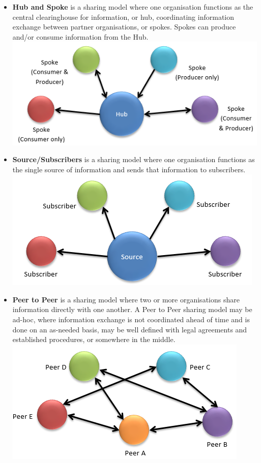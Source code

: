 \documentclass{eplmastersthesis}
\begin{document}
\begin{itemize}
\item \textbf{Hub and Spoke} is a sharing model where one organisation functions as the central clearinghouse for information, or hub, coordinating information exchange between partner organisations, or spokes. Spokes can produce and/or consume information from the Hub.\\
\centering
\includegraphics[scale=0.5]{res/hub-and-spoke}
\item \textbf{Source/Subscribers} is a sharing model where one organisation functions as the single source of information and sends that information to subscribers.\\
\centering
\includegraphics[scale=0.5]{res/source-subscriber}
\item \textbf{Peer to Peer}  is a sharing model where two or more organisations share information directly with one another. A Peer to Peer sharing model may be ad-hoc, where information exchange is not coordinated ahead of time and is done on an as-needed basis, may be well defined with legal agreements and established procedures, or somewhere in the middle.\\
\centering
\includegraphics[scale=0.5]{res/peer-to-peer}
\end{itemize}
\end{document}
